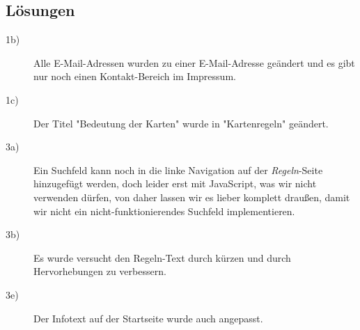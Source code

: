 \documentclass{scrartcl}
\begin{document}
\begin{enumerate}
\subsection*{Lösungen}
\begin{description}
\item[1b)] Alle E-Mail-Adressen wurden zu einer E-Mail-Adresse geändert und es gibt nur noch einen Kontakt-Bereich im Impressum.
\item[1c)] Der Titel "Bedeutung der Karten" wurde in "Kartenregeln" geändert.
\item[3a)] Ein Suchfeld kann noch in die linke Navigation auf der \textit{Regeln}-Seite hinzugefügt werden, doch leider erst mit JavaScript, was wir nicht verwenden dürfen, von daher lassen wir es lieber komplett draußen, damit wir nicht ein nicht-funktionierendes Suchfeld implementieren.
\item[3b)] Es wurde versucht den Regeln-Text durch kürzen und durch Hervorhebungen zu verbessern.
\item[3e)] Der Infotext auf der Startseite wurde auch angepasst.
\end{description}
\end{enumerate}
\end{document}
